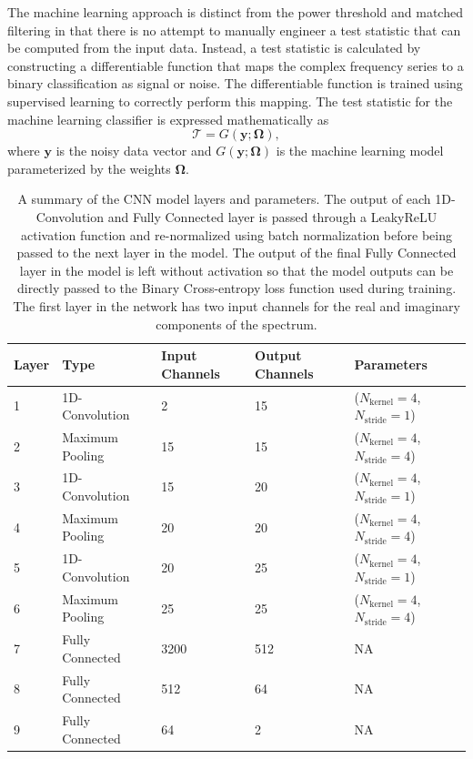 The machine learning approach is distinct from the power threshold and matched filtering in that there is no attempt to manually engineer a test statistic that can be computed from the input data. Instead, a test statistic is calculated by constructing a differentiable function that maps the complex frequency series to a binary classification as signal or noise. The differentiable function is trained using supervised learning to correctly perform this mapping. The test statistic for the machine learning classifier is expressed mathematically as
\begin{equation}
    \mathcal{T} = G(\mathbf{y};\mathbf{\Omega}),
\end{equation}
where $\mathbf{y}$ is the noisy data vector and $G(\mathbf{y}; \mathbf{\Omega})$ is the machine learning model parameterized by the weights $\mathbf{\Omega}$.

\begin{table}[h]
\centering
\caption{A summary of the CNN model layers and parameters. The output of each 1D-Convolution and Fully Connected layer is passed through a LeakyReLU activation function and re-normalized using batch normalization before being passed to the next layer in the model. The output of the final Fully Connected layer in the model is left without activation so that the model outputs can be directly passed to the Binary Cross-entropy loss function used during training. The first layer in the network has two input channels for the real and imaginary components of the spectrum. \label{tab:cnn_model_params}}
\smallskip
\begin{tabular}{@{}lllll@{}}
\hline
Layer&Type&Input Channels&Output Channels&Parameters\\
\hline
1 & 1D-Convolution & 2 & 15 & ($N_{\textrm{kernel}}=4$, $N_{\textrm{stride}}=1$)\\
2 & Maximum Pooling & 15 & 15 & ($N_{\textrm{kernel}}=4$, $N_{\textrm{stride}}=4$) \\
3 & 1D-Convolution & 15 & 20 & ($N_{\textrm{kernel}}=4$, $N_{\textrm{stride}}=1$)\\
4 & Maximum Pooling & 20 & 20 & ($N_{\textrm{kernel}}=4$, $N_{\textrm{stride}}=4$) \\
5 & 1D-Convolution & 20 & 25 & ($N_{\textrm{kernel}}=4$, $N_{\textrm{stride}}=1$)\\
6 & Maximum Pooling & 25 & 25 & ($N_{\textrm{kernel}}=4$, $N_{\textrm{stride}}=4$) \\
7 & Fully Connected & 3200 & 512 & NA \\
8 & Fully Connected & 512 & 64 & NA \\
9 & Fully Connected & 64 & 2 & NA \\
\hline
\end{tabular}
\end{table}

